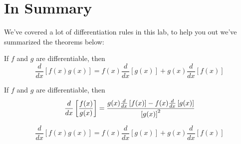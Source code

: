 \documentclass{ximera}
\begin{document}
\section{In Summary}
We've covered a lot of differentiation rules in this lab, to help you out we've summarized the theorems below:
\begin{theorem}
If $f$ and $g$ are differentiable, then
\[
\dfrac{d}{dx}\left[f(x)g(x)\right]=f(x)\dfrac{d}{dx}\left[g(x)\right]+g(x)\dfrac{d}{dx}\left[f(x)\right]
\]
\end{theorem}
\begin{theorem}
If $f$ and $g$ are differentiable, then
\[
\dfrac{d}{dx}\left[\dfrac{f(x)}{g(x)}\right]=\dfrac{g(x)\frac{d}{\mathop{}\!d x}\left[f(x)\right]-f(x)\frac{d}{\mathop{}\!d x}\left[g(x)\right]}{\left[g(x)\right]^2}
\]
\end{theorem}
\begin{theorem}
\[
\dfrac{d}{dx}\left[f(x)g(x)\right]=f(x)\dfrac{d}{dx}\left[g(x)\right]+g(x)\dfrac{d}{dx}\left[f(x)\right]
\]
\end{theorem}
\end{document}
